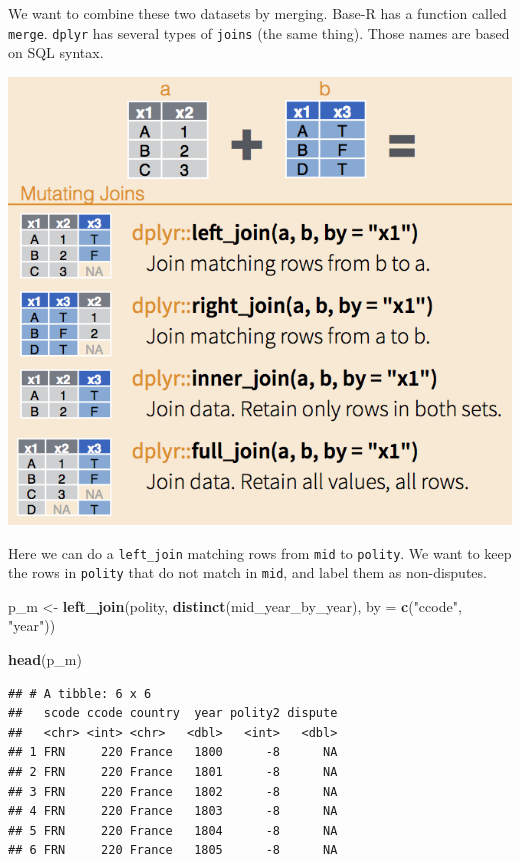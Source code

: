 \documentclass[]{book}
\newenvironment{Shaded}{\begin{snugshade}}{\end{snugshade}}
\newcommand{\DataTypeTok}[1]{\textcolor[rgb]{0.13,0.29,0.53}{#1}}
\newcommand{\KeywordTok}[1]{\textcolor[rgb]{0.13,0.29,0.53}{\textbf{#1}}}
\newcommand{\NormalTok}[1]{#1}
\newcommand{\StringTok}[1]{\textcolor[rgb]{0.31,0.60,0.02}{#1}}
\theoremstyle{definition}
\theoremstyle{definition}
\theoremstyle{definition}
\theoremstyle{remark}
\begin{document}
\begin{Shaded}
\begin{Highlighting}[]
\begin{Shaded}
\begin{Highlighting}[]
\begin{Shaded}
\begin{Highlighting}[]
We want to combine these two datasets by merging. Base-R has a function called \texttt{merge}. \texttt{dplyr} has several types of \texttt{joins} (the same thing). Those names are based on SQL syntax.

\includegraphics{images/dplyr-joins.png}

Here we can do a \texttt{left\_join} matching rows from \texttt{mid} to \texttt{polity}. We want to keep the rows in \texttt{polity} that do not match in \texttt{mid}, and label them as non-disputes.

\begin{Shaded}
\begin{Highlighting}[]
\NormalTok{p_m <-}\StringTok{ }\KeywordTok{left_join}\NormalTok{(polity,}
                 \KeywordTok{distinct}\NormalTok{(mid_year_by_year),}
                 \DataTypeTok{by =} \KeywordTok{c}\NormalTok{(}\StringTok{"ccode"}\NormalTok{, }\StringTok{"year"}\NormalTok{))}

\KeywordTok{head}\NormalTok{(p_m)}
\end{Highlighting}
\end{Shaded}

\begin{verbatim}
## # A tibble: 6 x 6
##   scode ccode country  year polity2 dispute
##   <chr> <int> <chr>   <dbl>   <int>   <dbl>
## 1 FRN     220 France   1800      -8      NA
## 2 FRN     220 France   1801      -8      NA
## 3 FRN     220 France   1802      -8      NA
## 4 FRN     220 France   1803      -8      NA
## 5 FRN     220 France   1804      -8      NA
## 6 FRN     220 France   1805      -8      NA
\end{verbatim}


\end{Highlighting}
\end{Shaded}
\end{Highlighting}
\end{Shaded}
\end{Highlighting}
\end{Shaded}
\end{document}
